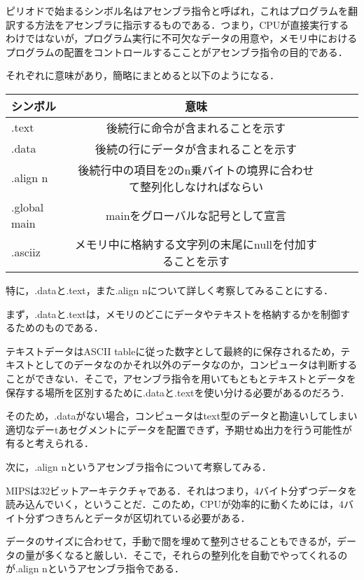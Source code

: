 \documentclass[a4j]{jarticle}
\begin{document}
ピリオドで始まるシンボル名はアセンブラ指令と呼ばれ，これはプログラムを翻訳する方法をアセンブラに指示するものである．つまり，CPUが直接実行するわけではないが，プログラム実行に不可欠なデータの用意や，メモリ中におけるプログラムの配置をコントロールするこことがアセンブラ指令の目的である．

それぞれに意味があり，簡略にまとめると以下のようになる．

\begin{center}
\begin{tabular}{lclcl}\hline
シンボル&意味\\ \hline \hline
.text&後続行に命令が含まれることを示す\\ \hline
.data&後続の行にデータが含まれることを示す\\ \hline
.align n&後続行中の項目を2のn乗バイトの境界に合わせて整列化しなければならい\\ \hline
.global main&mainをグローバルな記号として宣言\\ \hline
.asciiz&メモリ中に格納する文字列の末尾にnullを付加することを示す\\ \hline
\end{tabular}
\end{center}

特に，.dataと.text，また.align nについて詳しく考察してみることにする．

まず，.dataと.textは，メモリのどこにデータやテキストを格納するかを制御するためのものである．

テキストデータはASCII tableに従った数字として最終的に保存されるため，テキストとしてのデータなのかそれ以外のデータなのか，コンピュータは判断することができない．そこで，アセンブラ指令を用いてもともとテキストとデータを保存する場所を区別するために.dataと.textを使い分ける必要があるのだろう．

そのため，.dataがない場合，コンピュータはtext型のデータと勘違いしてしまい適切なデーtあセグメントにデータを配置できず，予期せぬ出力を行う可能性が有ると考えられる．

次に，.align nというアセンブラ指令について考察してみる．

MIPSは32ビットアーキテクチャである．それはつまり，4バイト分ずつデータを読み込んでいく，ということだ．このため，CPUが効率的に動くためには，4バイト分ずつきちんとデータが区切れている必要がある．

データのサイズに合わせて，手動で間を埋めて整列させることもできるが，データの量が多くなると厳しい．そこで，それらの整列化を自動でやってくれるのが.align nというアセンブラ指令である．
\end{document}
